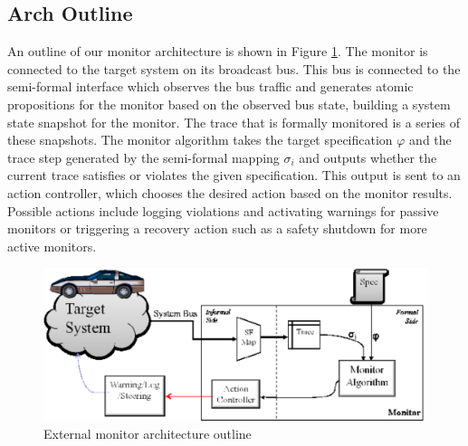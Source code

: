 \subsection{Arch Outline}
An outline of our monitor architecture is shown in Figure \ref{fig:architecture}. The monitor is connected to the target system on its broadcast bus. This bus is connected to the semi-formal interface which observes the bus traffic and generates atomic propositions for the monitor based on the observed bus state, building a system state snapshot for the monitor. 
The trace that is formally monitored is a series of these snapshots. The monitor algorithm takes the target specification $\varphi$ and the trace step generated by the semi-formal mapping $\sigma_i$ and outputs whether the current trace satisfies or violates the given specification. 
This output is sent to an action controller, which chooses the desired action based on the monitor results. Possible actions include logging violations and activating warnings for passive monitors or triggering a recovery action such as a safety shutdown for more active monitors.


\begin{figure}
\includegraphics[width=4.5in]{img/mon_arch}
\caption{External monitor architecture outline \label{fig:architecture}}
\end{figure}

